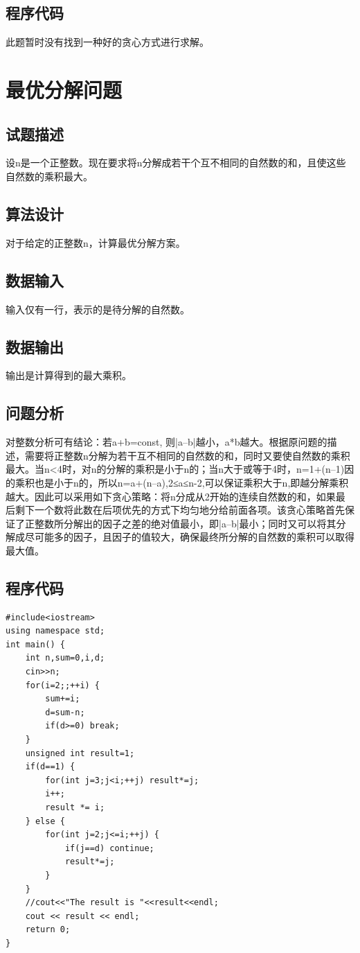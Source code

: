 \documentclass[UTF8]{ctexart}
\begin{document}
    \subsection{程序代码}
    此题暂时没有找到一种好的贪心方式进行求解。
    
    \section{最优分解问题}
    \subsection{试题描述}
    设n是一个正整数。现在要求将n分解成若干个互不相同的自然数的和，且使这些自然数的乘积最大。
    \subsection{算法设计}
    对于给定的正整数n，计算最优分解方案。
    \subsection{数据输入}
    输入仅有一行，表示的是待分解的自然数。
    \subsection{数据输出}
    输出是计算得到的最大乘积。
    \subsection{问题分析}
    对整数分析可有结论：若a+b=const, 则|a–b|越小，a*b越大。根据原问题的描述，需要将正整数n分解为若干互不相同的自然数的和，同时又要使自然数的乘积最大。当n<4时，对n的分解的乘积是小于n的；当n大于或等于4时，n=1+(n–1)因的乘积也是小于n的，所以n=a+(n–a),2≤a≤n-2,可以保证乘积大于n,即越分解乘积越大。因此可以采用如下贪心策略：将n分成从2开始的连续自然数的和，如果最后剩下一个数将此数在后项优先的⽅式下均匀地分给前面各项。该贪心策略首先保证了正整数所分解出的因子之差的绝对值最小，即|a–b|最小；同时又可以将其分解成尽可能多的因子，且因子的值较大，确保最终所分解的自然数的乘积可以取得最大值。
    \subsection{程序代码}
    \begin{small}
    \begin{lstlisting}
#include<iostream>
using namespace std;
int main() {
    int n,sum=0,i,d;
    cin>>n;
    for(i=2;;++i) {
        sum+=i;
        d=sum-n;
        if(d>=0) break;
    }
    unsigned int result=1;
    if(d==1) {
        for(int j=3;j<i;++j) result*=j;
        i++;
        result *= i;
    } else {
        for(int j=2;j<=i;++j) {
            if(j==d) continue;
            result*=j;
        }
    }
    //cout<<"The result is "<<result<<endl;
    cout << result << endl;
    return 0;
}
    \end{lstlisting}
    \end{small}
\end{document}
